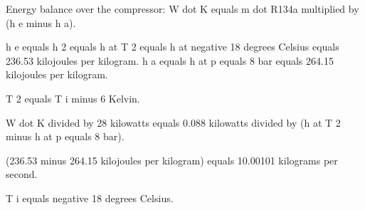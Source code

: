 Energy balance over the compressor:  
W dot K equals m dot R134a multiplied by (h e minus h a).  

h e equals h 2 equals h at T 2 equals h at negative 18 degrees Celsius equals 236.53 kilojoules per kilogram.  
h a equals h at p equals 8 bar equals 264.15 kilojoules per kilogram.  

T 2 equals T i minus 6 Kelvin.  

W dot K divided by 28 kilowatts equals 0.088 kilowatts divided by (h at T 2 minus h at p equals 8 bar).  

(236.53 minus 264.15 kilojoules per kilogram) equals 10.00101 kilograms per second.  

T i equals negative 18 degrees Celsius.